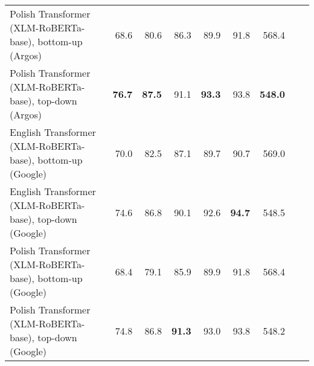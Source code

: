 \begin{table}[ht!]
{\begin{tabular}{lrrrrrrrr}
  Polish Transformer (XLM-RoBERTa-base), bottom-up (Argos) & 68.6 & 80.6 & 86.3 & 89.9 & 91.8 & 568.4 \\ 
  Polish Transformer (XLM-RoBERTa-base), top-down (Argos) & \textbf{76.7} & \textbf{87.5} & 91.1 & \textbf{93.3} & 93.8 & \textbf{548.0} \\ 
  English Transformer (XLM-RoBERTa-base), bottom-up (Google) & 70.0 & 82.5 & 87.1 & 89.7 & 90.7 & 569.0 \\ 
  English Transformer (XLM-RoBERTa-base), top-down (Google) & 74.6 & 86.8 & 90.1 & 92.6 & \textbf{94.7} & 548.5 \\ 
  Polish Transformer (XLM-RoBERTa-base), bottom-up (Google) & 68.4 & 79.1 & 85.9 & 89.9 & 91.8 & 568.4 \\ 
  Polish Transformer (XLM-RoBERTa-base), top-down (Google) & 74.8 & 86.8 & \textbf{91.3} & 93.0 & 93.8 & 548.2 \\ 
   \hline
\end{tabular}
}
\end{table}




